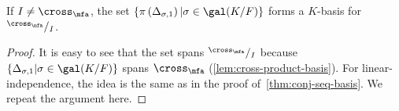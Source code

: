 \begin{lemma}\label{lem:cross-product-quotient-basis}
  If $I \ne \cross_{\mfa}$, the set $\{\pi\left(\Delta_{\sigma, 1}\right)|\sigma\in\gal(K/F)\}$ forms a $K$-basis for ${}^{\cross_{\mfa}}/_{I}$.
  \leanok
\end{lemma}
\begin{proof}
  It is easy to see that the set spans ${}^{\cross_{\mfa}}/_{I}$ because $\{\Delta_{\sigma, 1}|\sigma\in\gal(K/F)\}$ spans $\cross_{\mfa}$ (\cref{lem:cross-product-basis}). For linear-independence, the idea is the same as in the proof of~\cref{thm:conj-seq-basis}. We repeat the argument here.


\end{proof}
